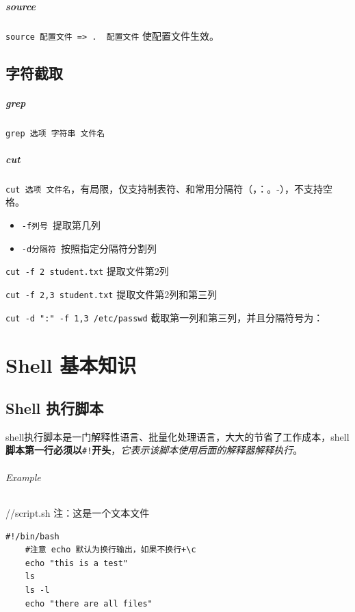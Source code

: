 \documentclass[UTF8,a4paper,12pt]{ctexbook}
\begin{document}
		\paragraph{source}\verb|source 配置文件 => .  配置文件| 使配置文件生效。
	
	\section{字符截取}
		\paragraph{grep}\verb|grep 选项 字符串 文件名|

		\paragraph{cut}\verb|cut 选项 文件名|，有局限，仅支持制表符、和常用分隔符（，：。-），不支持空格。
			\begin{itemize}
				\item \verb|-f列号 |提取第几列
				\item \verb|-d分隔符 |按照指定分隔符分割列
			\end{itemize}
			
			\verb|cut -f 2 student.txt| 提取文件第2列
			
			\verb|cut -f 2,3 student.txt| 提取文件第2列和第三列
			
			\verb|cut -d ":" -f 1,3 /etc/passwd| 截取第一列和第三列，并且分隔符号为：
	

  
  	
\chapter{Shell 基本知识}

		 \section{Shell 执行脚本}
			 shell执行脚本是一门解释性语言、批量化处理语言，大大的节省了工作成本，shell\textbf{脚本第一行必须以}\verb|#!|\textbf{开头}，\textit{它表示该脚本使用后面的解释器解释执行}。
			 
			\subparagraph{Example}
			 //script.sh   注：这是一个文本文件
			 \begin{lstlisting}[frame=L,xleftmargin=.06\textwidth]
	#!/bin/bash
	#注意 echo 默认为换行输出，如果不换行+\c 
	echo "this is a test"	
	ls
	ls -l
	echo "there are all files"
			 \end{lstlisting}
			 
\end{document}
